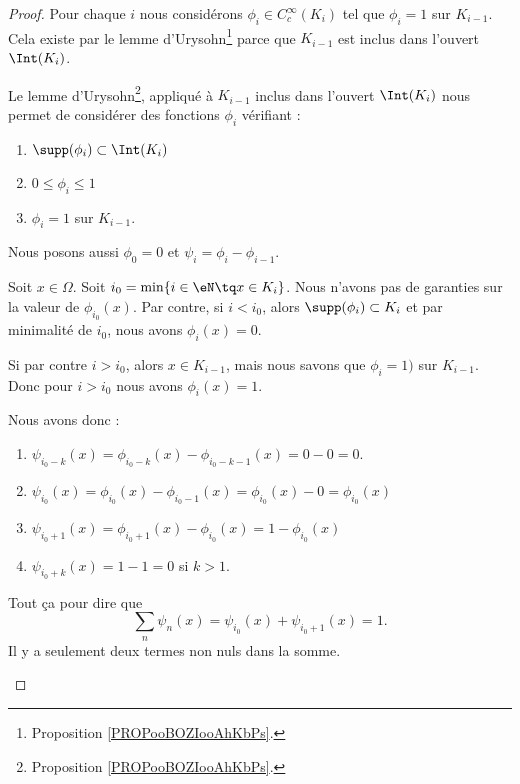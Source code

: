 \begin{proof}
	Pour chaque \( i\) nous considérons \( \phi_i\in C^{\infty}_c(K_i)\) tel que \( \phi_i=1\) sur \( K_{i-1}\). Cela existe par le lemme d'Urysohn\footnote{Proposition \ref{PROPooBOZIooAhKbPs}.} parce que \( K_{i-1}\) est inclus dans l'ouvert \( \Int(K_i)\).


	\begin{subproof}
		Le lemme d'Urysohn\footnote{Proposition \ref{PROPooBOZIooAhKbPs}.}, appliqué à \( K_{i-1}\) inclus dans l'ouvert \( \Int(K_i)\) nous permet de considérer des fonctions \( \phi_i\) vérifiant :
		\begin{enumerate}
			\item
			      \( \supp(\phi_i)\subset\Int(K_i)\)
			\item
			      \( 0\leq \phi_i\leq 1\)
			\item
			      \( \phi_i=1\) sur \( K_{i-1}\).
		\end{enumerate}
		Nous posons aussi \( \phi_0=0\) et \( \psi_i=\phi_i-\phi_{i-1}\).

		\spitem[\( \sum_n\psi_n(x)=1\)]
		Soit \( x\in \Omega\). Soit \( i_0=\min\{ i\in \eN\tq x\in K_i \}\). Nous n'avons pas de garanties sur la valeur de \( \phi_{i_0}(x)\). Par contre, si \( i<i_0\), alors \( \supp(\phi_i)\subset K_i\) et par minimalité de \( i_0\), nous avons \( \phi_i(x)=0\).

		Si par contre \( i>i_0\), alors \( x\in K_{i-1}\), mais nous savons que \( \phi_i=1)\) sur \( K_{i-1}\). Donc pour \( i>i_0\) nous avons \( \phi_i(x)=1\).

		Nous avons donc :
		\begin{enumerate}
			\item
			      \( \psi_{i_0-k}(x)=\phi_{i_0-k}(x)-\phi_{i_0-k-1}(x)=0-0=0\).
			\item
			      \( \psi_{i_0}(x)=\phi_{i_0}(x)-\phi_{i_0-1}(x)=\phi_{i_0}(x)-0=\phi_{i_0}(x)\)
			\item
			      \( \psi_{i_0+1}(x)=\phi_{i_0+1}(x)-\phi_{i_0}(x)=1-\phi_{i_0}(x)\)
			\item
			      \( \psi_{i_0+k}(x)=1-1=0\) si \( k>1\).
		\end{enumerate}
		Tout ça pour dire que
		\begin{equation}		\label{EQooWUUAooLCgDMP}
			\sum_n\psi_n(x)=\psi_{i_0}(x)+\psi_{i_0+1}(x)=1.
		\end{equation}
		Il y a seulement deux termes non nuls dans la somme.


\end{subproof}
\end{proof}

